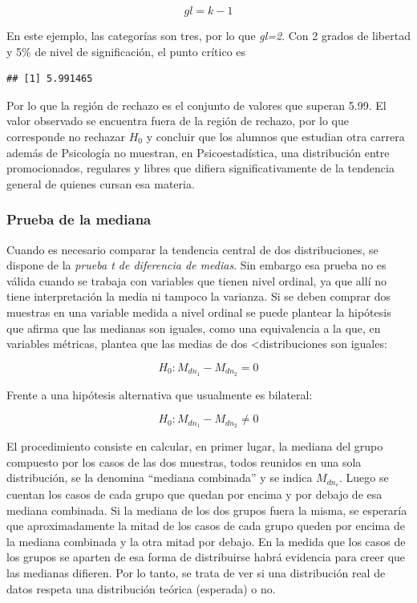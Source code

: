\documentclass[]{book}
\begin{document}
\[gl = k - 1\]

En este ejemplo, las categorías son tres, por lo que \emph{gl=2}. Con 2
grados de libertad y 5\% de nivel de significación, el punto crítico es

\begin{verbatim}
## [1] 5.991465
\end{verbatim}

Por lo que la región de rechazo es el conjunto de
valores que superan 5.99. El valor observado se encuentra fuera de la
región de rechazo, por lo que corresponde no rechazar \(H_0\) y concluir
que los alumnos que estudian otra carrera además de Psicología no
muestran, en Psicoestadística, una distribución entre promocionados,
regulares y libres que difiera significativamente de la tendencia
general de quienes cursan esa materia.

\hypertarget{prueba-de-la-mediana}{%
\subsubsection{Prueba de la mediana}\label{prueba-de-la-mediana}}

Cuando es necesario comparar la tendencia central de dos distribuciones,
se dispone de la \emph{prueba t de diferencia de medias}. Sin embargo esa
prueba no es válida cuando se trabaja con variables que tienen nivel
ordinal, ya que allí no tiene interpretación la media ni tampoco la
varianza. Si se deben comprar dos muestras en una variable medida a
nivel ordinal se puede plantear la hipótesis que afirma que las medianas
son iguales, como una equivalencia a la que, en variables métricas,
plantea que las medias de dos \textless{}distribuciones son iguales:

\[H_0: M_{dn_1} - M_{dn_2} = 0\]

Frente a una hipótesis alternativa que usualmente es bilateral:

\[H_0: M_{dn_1} - M_{dn_2} \neq 0\]

El procedimiento consiste en calcular, en primer lugar, la mediana del
grupo compuesto por los casos de las dos muestras, todos reunidos en una
sola distribución, se la denomina ``mediana combinada'' y se indica
\(M_{dn_c}\). Luego se cuentan los casos de cada grupo que quedan
por encima y por debajo de esa mediana combinada. Si la mediana de los
dos grupos fuera la misma, se esperaría que aproximadamente la mitad de
los casos de cada grupo queden por encima de la mediana combinada y la
otra mitad por debajo. En la medida que los casos de los grupos se
aparten de esa forma de distribuirse habrá evidencia para creer que las
medianas difieren. Por lo tanto, se trata de ver si una distribución
real de datos respeta una distribución teórica (esperada) o no.
\end{document}

